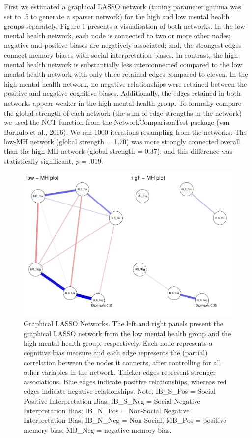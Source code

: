\documentclass[man,floatsintext]{apa6}
\begin{document}
First we estimated a graphical LASSO network (tuning parameter gamma was set to .5 to generate a sparser network) for the high and low mental health groups separately. Figure 1 presents a visualisation of both networks. In the low mental health network, each node is connected to two or more other nodes; negative and positive biases are negatively associated; and, the strongest edges connect memory biases with social interpretation biases. In contrast, the high mental health network is substantially less interconnected compared to the low mental health network with only three retained edges compared to eleven. In the high mental health network, no negative relationships were retained between the positive and negative cognitive biases. Additionally, the edges retained in both networks appear weaker in the high mental health group. To formally compare the global strength of each network (the sum of edge strengths in the network) we used the NCT function from the NetworkComparisonTest package (van Borkulo et al., 2016). We ran 1000 iterations resampling from the networks. The low-MH network (global strength = 1.70) was more strongly connected overall than the high-MH network (global strength = 0.37), and this difference was statistically significant, \emph{p} = .019.

\begin{figure}
\centering
\includegraphics{script_files/figure-latex/unnamed-chunk-1-1.pdf}
\caption{\label{fig:unnamed-chunk-1}Graphical LASSO Networks. The left and right panels present the graphical LASSO network from the low mental health group and the high mental health group, respectively. Each node represents a cognitive bias measure and each edge represents the (partial) correlation between the nodes it connects, after controlling for all other variables in the network. Thicker edges represent stronger associations. Blue edges indicate positive relationships, whereas red edges indicate negative relationships.
Note. IB\_S\_Pos = Social Positive Interpretation Bias; IB\_S\_Neg = Social Negative Interpretation Bias; IB\_N\_Pos = Non-Social Negative Interpretation Bias; IB\_N\_Neg = Non-Social; MB\_Pos = positive memory bias; MB\_Neg = negative memory bias.}
\end{figure}
\end{document}
